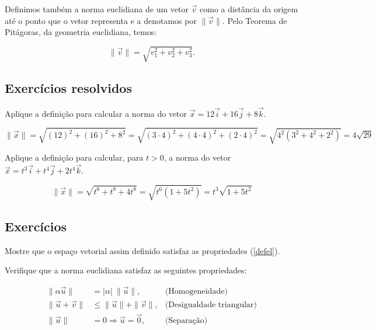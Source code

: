 Definimos também a norma euclidiana de um vetor $\vec{v}$ como a distância da origem até o ponto que o vetor representa e a denotamos por $\|\vec{v}\|$. Pelo Teorema de Pitágoras, da geometria euclidiana, temos:


\begin{equation}\label{defnorma}
\|\vec{v}\|=\sqrt{v_1^2+v_2^2+v_3^2}.
\end{equation}

\subsection*{Exercícios resolvidos}

\begin{exeresol} \label{exenorm1}
 Aplique a definição para calcular a norma do vetor $\vec{x} = 12 \vec{i} + 16 \vec{j} + 8 \vec{k}$. 
\end{exeresol}
\begin{resol}
$$\|\vec{x}\| = \sqrt{(12)^2+(16)^2+8^2} = \sqrt{(3\cdot4)^2 + (4\cdot4)^2 + (2\cdot 4)^2} = \sqrt{4^2(3^2 + 4^2 + 2^2)} = 4\sqrt{29}$$
\end{resol}

\begin{exeresol} \label{exenorm2}
 Aplique a definição para calcular, para $t>0$, a norma do vetor
 $\vec{x} = t^3 \vec{i} + t^4 \vec{j} + 2t^4 \vec{k}$.
\end{exeresol}

\begin{resol}
$$\|\vec{x}\| = \sqrt{t^6 + t^8 + 4t^8} = \sqrt{t^6(1 + 5t^2)}=t^3\sqrt{1 + 5t^2}$$
\end{resol}

\construirExeresol

\subsection*{Exercícios}

\begin{exer} Mostre que o espaço vetorial assim definido satisfaz as propriedades (\ref{defel}).
\end{exer}

\begin{exer}\label{exnorma}Verifique que a norma euclidiana satisfaz as seguintes propriedades:

\begin{subequations}\label{propnorma}
\begin{align}
\|\alpha \vec{u}\|&=|\alpha|~\!\|\vec{u}\|,&\text{(Homogeneidade)}\label{propnormahom}\\
\|\vec{u}+\vec{v}\|&\leq \|\vec{u}\|+\|\vec{v}\|,&\text{(Desigualdade triangular)}\label{propnormatri}\\
\|\vec{u}\|&=0 \Longrightarrow \vec{u}=\vec{0},&\text{(Separação)}\label{propnormasep}
\end{align}
\end{subequations}
\end{exer}

